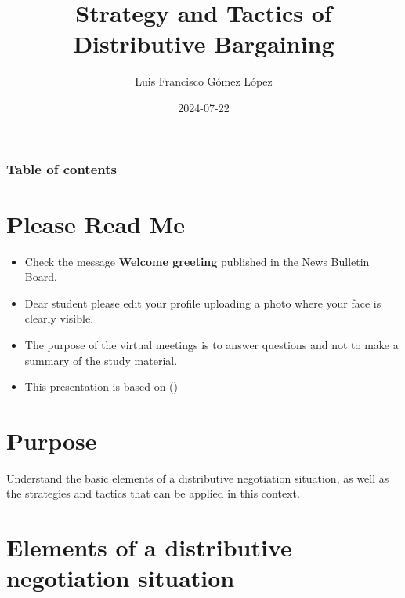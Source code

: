 \documentclass[
  ignorenonframetext,
]{beamer}
\title{Strategy and Tactics of Distributive Bargaining}
\author{Luis Francisco Gómez López}
\date{2024-07-22}
\institute{FAEDIS}
\renewcommand*\contentsname{Table of contents}
\newcommand\contentsname{Table of contents}
\begin{document}
\frame{\titlepage}

\renewcommand*\contentsname{Table of contents}
\begin{frame}[allowframebreaks]
  \frametitle{Table of contents}
  \tableofcontents[hideallsubsections]
\end{frame}

\section{Please Read Me}\label{please-read-me}

\begin{frame}{}
\label{section}
\begin{itemize}
\item
  Check the message \textbf{Welcome greeting} published in the News
  Bulletin Board.
\item
  Dear student please edit your profile uploading a photo where your
  face is clearly visible.
\item
  The purpose of the virtual meetings is to answer questions and not to
  make a summary of the study material.
\item
  This presentation is based on
  ()
\end{itemize}
\end{frame}

\section{Purpose}\label{purpose}

\begin{frame}{}
\label{section-1}
Understand the basic elements of a distributive negotiation situation,
as well as the strategies and tactics that can be applied in this
context.
\end{frame}

\section{Elements of a distributive negotiation
situation}\label{elements-of-a-distributive-negotiation-situation}
\end{document}
